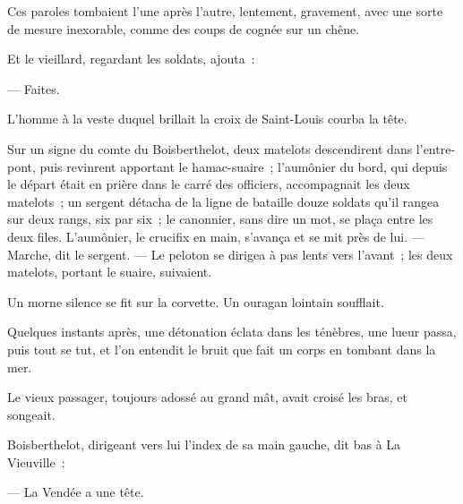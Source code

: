 \documentclass[french,twoside]{book} %
\begin{document}
Ces paroles tombaient l’une après l’autre, lentement, gravement, avec une sorte de mesure inexorable, comme des coups de cognée sur un chêne.\par
Et le vieillard, regardant les soldats, ajouta :\par
— Faites.\par
L’homme à la veste duquel brillait la croix de Saint-Louis courba la tête.\par
Sur un signe du comte du Boisberthelot, deux matelots descendirent dans l’entre-pont, puis revinrent apportant le hamac-suaire ; l’aumônier du bord, qui depuis le départ était en prière dans le carré des officiers, accompagnait les deux matelots ; un sergent détacha de la ligne de bataille douze soldats qu’il rangea sur deux rangs, six par six ; le canonnier, sans dire un mot, se plaça entre les deux files. L’aumônier, le crucifix en main, s’avança et se mit près de lui. — Marche, dit le sergent. — Le peloton se dirigea à pas lents vers l’avant ; les deux matelots, portant le suaire, suivaient.\par
 Un morne silence se fit sur la corvette. Un ouragan lointain soufflait.\par
Quelques instants après, une détonation éclata dans les ténèbres, une lueur passa, puis tout se tut, et l’on entendit le bruit que fait un corps en tombant dans la mer.\par
Le vieux passager, toujours adossé au grand mât, avait croisé les bras, et songeait.\par
Boisberthelot, dirigeant vers lui l’index de sa main gauche, dit bas à La Vieuville :\par
— La Vendée a une tête.
\end{document}
